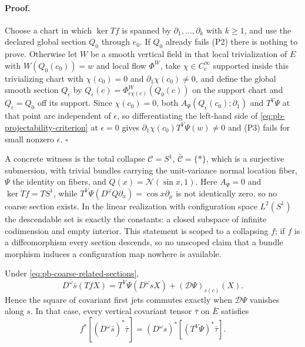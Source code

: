 \paragraph{Proof.}
Choose a chart in which $\ker Tf$ is spanned by
$\partial_1,\dots,\partial_k$ with $k\geq1$, and use the declared global
section $Q_0$ through $e_0$.  If $Q_0$ already fails
(P2) there is nothing to prove.  Otherwise let $W$ be a smooth vertical field
in that local trivialization of $E$ with $W(Q_0(c_0))=w$ and local flow
$\Phi^W$, take
$\chi\in C^\infty_c$ supported inside this trivializing chart with
$\chi(c_0)=0$ and $\partial_1\chi(c_0)\ne0$, and define the global smooth
section $Q_\epsilon$ by
$Q_\epsilon(c)=\Phi^W_{\epsilon\chi(c)}(Q_0(c))$ on the support chart and
$Q_\epsilon=Q_0$ off its support.  Since
$\chi(c_0)=0$, both $A_\Psi(Q_\epsilon(c_0);\partial_1)$ and $T^V\Psi$ at that
point are independent of $\epsilon$, so differentiating the left-hand side of
\eqref{eq:pb-projectability-criterion} at $\epsilon=0$ gives
$\partial_1\chi(c_0)T^V\Psi(w)\ne0$ and (P3) fails for small nonzero
$\epsilon$.  $\square$

A concrete witness is the total collapse $\mathcal C=S^1$,
$\bar{\mathcal C}=\{\ast\}$, which is a surjective submersion, with trivial
bundles carrying the unit-variance normal location fiber, $\Psi$ the identity
on fibers, and $Q(x)=\mathcal N(\sin x,1)$.  Here $A_\Psi=0$ and
$\ker Tf=TS^1$, while
$T^V\Psi(D^\omega Q\partial_x)=\cos x\partial_\mu$ is not identically zero, so
no coarse section exists.  In the linear realization with configuration space
$L^2(S^1)$ the descendable set is exactly the constants: a closed subspace of
infinite codimension and empty interior.  This statement is scoped to a
collapsing $f$; if $f$ is a diffeomorphism every section descends, so no
unscoped claim that a bundle morphism induces a configuration map nowhere is
available.  

Under \eqref{eq:pb-coarse-related-sections},
\begin{equation}
D^{\bar\omega}\bar s(TfX)
=T^V\Psi(D^\omega sX)+(\mathcal D\Psi)_{s(c)}(X).
\label{eq:pb-covariant-jet-chain-rule}
\end{equation}
Hence the square of covariant first jets commutes exactly when
$\mathcal D\Psi$ vanishes along $s$.  In that case, every vertical covariant
tensor $\bar\tau$ on $\bar E$ satisfies
\begin{equation}
f^*[(D^{\bar\omega}\bar s)^*\bar\tau]
=(D^\omega s)^*[(T^V\Psi)^*\bar\tau].
\label{eq:pb-covariant-tensor-naturality}
\end{equation}

